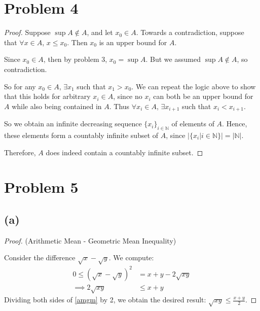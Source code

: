 \documentclass{article}
\begin{document}
\section*{Problem 4}
\begin{proof}
	Suppose $\sup{A}\notin A$, and let $x_0 \in A$. Towards a contradiction, suppose that $\forall x \in A$, $x \leq x_0$. Then $x_0$ is an upper bound for $A$.
	
	Since $x_0 \in A$, then by problem 3, $x_0 = \sup{A}$. But we assumed $\sup{A} \notin A$, so contradiction.
	
	So for any $x_0 \in A$, $\exists x_1$ such that $x_1 > x_0$. We can repeat the logic above to show that this holds for arbitrary $x_i \in A$, since no $x_i$ can both be an upper bound for $A$ while also being contained in $A$. Thus $\forall x_i \in A$, $\exists x_{i+1}$ such that $x_i < x_{i+1}$. 
	
	So we obtain an infinite decreasing sequence $\{x_i\}_{i \in \mathbb{N}}$ of elements of $A$. Hence, these elements form a countably infinite subset of $A$, since $|\{x_i | i \in \mathbb{N}\}| = |\mathbb{N}|$.
	
	Therefore, $A$ does indeed contain a countably infinite subset.
\end{proof}

\section*{Problem 5}
\subsection*{(a)}
\begin{proof}
	(Arithmetic Mean - Geometric Mean Inequality)
	
	Consider the difference $\sqrt{x} - \sqrt{y}$. We compute:
	\begin{align}
		0 \leq \left(\sqrt{x} - \sqrt{y}\right)^2 &= x + y -2 \sqrt{xy} \\
		\implies 2\sqrt{xy} &\leq x + y \label{amgm}
	\end{align} 
	Dividing both sides of \eqref{amgm} by 2, we obtain the desired result: $\sqrt{xy} \leq \frac{x + y}{2}$.
\end{proof}
\end{document}

